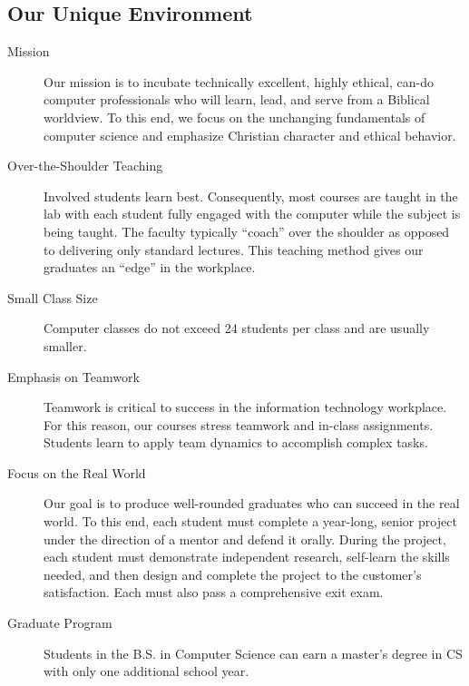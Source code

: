 \subsection{Our Unique Environment}
\begin{description}
	\item[Mission] Our mission is to incubate technically excellent, highly ethical, can-do computer professionals who will learn, lead, and serve from a Biblical worldview. To this end, we focus on the unchanging fundamentals of computer science and emphasize Christian character and ethical behavior.
	\item[Over-the-Shoulder Teaching] Involved students learn best. Consequently, most courses are taught in the lab with each student fully engaged with the computer while the subject is being taught. The faculty typically ``coach'' over the shoulder as opposed to delivering only standard lectures. This teaching method gives our graduates an “edge” in the workplace.
	\item[Small Class Size] Computer classes do not exceed 24 students per class and are usually smaller.
	\item[Emphasis on Teamwork] Teamwork is critical to success in the information technology workplace. For this reason, our courses stress teamwork and in-class assignments. Students learn to apply team dynamics to accomplish complex tasks.
	\item[Focus on the Real World] Our goal is to produce well-rounded graduates who can succeed in the real world.  To this end, each student must complete a year-long, senior project under the direction of a mentor and defend it orally. During the project, each student must demonstrate independent research, self-learn the skills needed, and then design and complete the project to the customer's satisfaction.  Each must also pass a comprehensive exit exam.
	\item[Graduate Program] Students in the B.S. in Computer Science can earn a master's degree in CS with only one additional school year.
\end{description}
